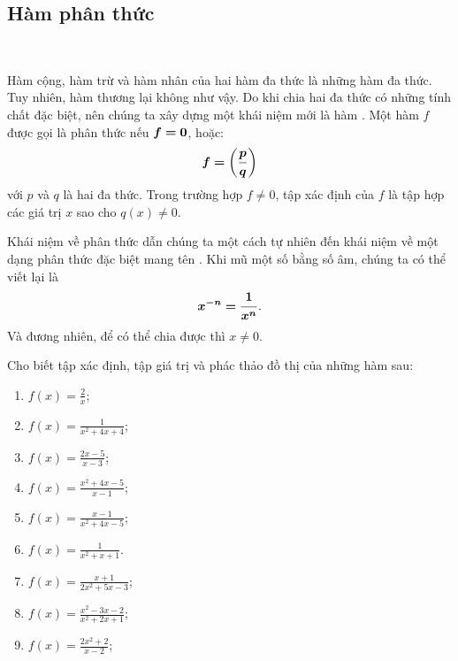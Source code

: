 \subsection{Hàm phân thức}

\ %

Hàm cộng, hàm trừ và hàm nhân của hai hàm đa thức là những hàm đa thức. Tuy nhiên, hàm thương lại không như vậy. Do khi chia hai đa thức có những tính chất đặc biệt, nên chúng ta xây dựng một khái niệm mới là hàm . Một hàm $f$ được gọi là phân thức nếu $\bm{f = 0}$, hoặc: $$\bm{f = \left(\frac{p}{q}\right)}$$ với $p$ và $q$ là hai đa thức. Trong trường hợp $f \neq 0$, tập xác định của $f$ là tập hợp các giá trị $x$ sao cho $q(x) \neq 0$. 

Khái niệm về phân thức dẫn chúng ta một cách tự nhiên đến khái niệm về một dạng phân thức đặc biệt mang tên . Khi mũ một số bằng số âm, chúng ta có thể viết lại là $$\bm{x^{-n} = \frac{1}{x^n}}.$$ Và đương nhiên, để có thể chia được thì $x \neq 0$.

\exercise Cho biết tập xác định, tập giá trị và phác thảo đồ thị của những hàm sau:
\begin{multicols}{3}
   \begin{enumerate}
      \item $\displaystyle f(x) = \frac{2}{x}$;
      \item $\displaystyle f(x) = \frac{1}{x^2 + 4x + 4}$;
      \item $\displaystyle f(x) = \frac{2x - 5}{x - 3}$;
      \item $\displaystyle f(x) = \frac{x^2 + 4x - 5}{x - 1}$;
      \item $\displaystyle f(x) = \frac{x - 1}{x^2 + 4x - 5}$;
      \item $\displaystyle f(x) = \frac{1}{x^2 + x + 1}$.
      \item $\displaystyle f(x) = \frac{x + 1}{2x^2 + 5x - 3}$;
      \item $\displaystyle f(x) = \frac{x^2 - 3x - 2}{x^2 + 2x + 1}$;
      \item $\displaystyle f(x) = \frac{2x^2 + 2}{x - 2}$;
   \end{enumerate}
\end{multicols}

\solution


